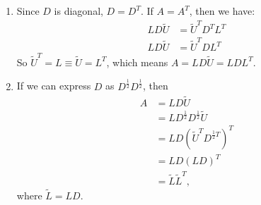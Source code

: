 \documentclass[12pt,letterpaper]{article}
\begin{document}
\begin{enumerate}
\begin{enumerate}
      \item Since $D$ is diagonal, $D=D^T$. If $A=A^T$, then we have:
        \begin{align*}
          LD\tilde{U} &= \tilde{U}^TD^TL^T \\
          LD\tilde{U} &= \tilde{U}^TDL^T
        \end{align*}
        So $\tilde{U}^T=L \equiv \tilde{U}=L^T$, which means
        $A=LD\tilde{U}=LDL^T$.

      \item If we can express $D$ as $D^{\frac12}D^{\frac12}$, then
        \begin{align*}
          A &= LD\tilde{U} \\
            &= LD^{\frac12}D^{\frac12}\tilde{U} \\
            &= LD\left(\tilde{U}^TD^{\frac12T}\right)^T \\
            &= LD\left(LD\right)^T \\
            &= \tilde{L}\tilde{L}^T,
        \end{align*}
        where $\tilde{L}=LD$.


\end{enumerate}
\end{enumerate}
\end{document}
